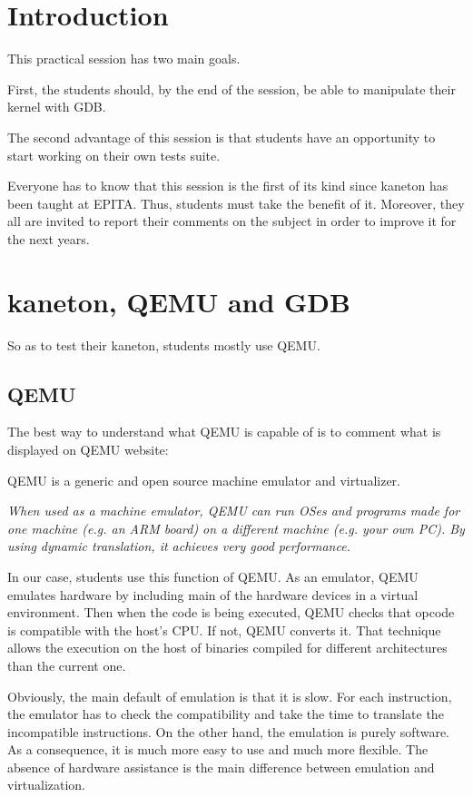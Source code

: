 \chapter{Introduction}
\label{chapter:Introduction}

This practical session has two main goals.

First, the students should, by the end of the session, be able to manipulate their kernel with GDB.

The second advantage of this session is that students have an opportunity to start working on their own tests suite.

Everyone has to know that this session is the first of its kind since kaneton has been taught at EPITA. Thus, students must take the benefit of it. Moreover, they all are invited to report their comments on the subject in order to improve it for the next years.

\chapter{kaneton, QEMU and GDB}
\label{chapter:kaneton, QEMU and GDB}

So as to test their kaneton, students mostly use QEMU.

\section{QEMU}
The best way to understand what QEMU is capable of is to comment what is displayed on QEMU website:

QEMU is a generic and open source machine emulator and virtualizer.

\textit{When used as a machine emulator, QEMU can run OSes and programs made for one machine (e.g. an ARM board) on a different machine (e.g. your own PC). By using dynamic translation, it achieves very good performance.}

In our case, students use this function of QEMU. As an emulator, QEMU emulates hardware by including main of the hardware devices in a virtual environment. Then when the code is being executed, QEMU checks that opcode is compatible with the host's CPU. If not, QEMU converts it. That technique allows the execution on the host of binaries compiled for different architectures than the current one.

Obviously, the main default of emulation is that it is slow. For each instruction, the emulator has to check the compatibility and take the time to translate the incompatible instructions. On the other hand, the emulation is purely software. As a consequence, it is much more easy to use and much more flexible. The absence of hardware assistance is the main difference between emulation and virtualization.


